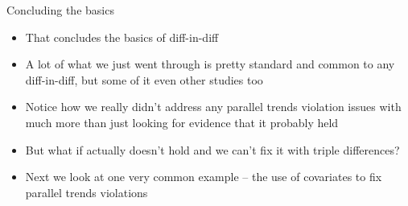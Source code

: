 \documentclass{beamer}
\begin{document}
\begin{frame}{Concluding the basics}


\begin{itemize}

\item That concludes the basics of diff-in-diff
\item A lot of what we just went through is pretty standard and common to any diff-in-diff, but some of it even other studies too
\item Notice how we really didn't address any parallel trends violation issues with much more than just looking for evidence that it probably held
\item But what if actually doesn't hold and we can't fix it with triple differences?  
\item Next we look at one very common example -- the use of covariates to fix parallel trends violations

\end{itemize}

\end{frame}
\end{document}
